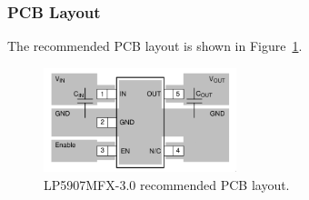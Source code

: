 \subsubsection{PCB Layout}
\label{sec:lp5907-3.0-pcb}

The recommended PCB layout is shown in Figure~\ref{fig:lp5907mfx-3.0-pcb}.

\begin{figure}[h]
	\centering
	\includegraphics[width=0.5\textwidth]{data/lp5907mfx-3-pcb}
	\caption{LP5907MFX-3.0 recommended PCB layout.}
	\label{fig:lp5907mfx-3.0-pcb}
\end{figure}


